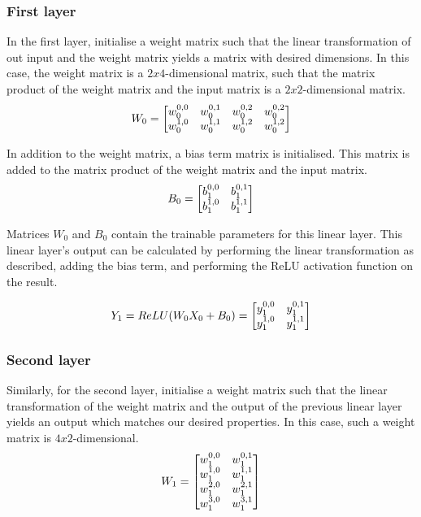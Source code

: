 \subsubsection{First layer}
In the first layer, initialise a weight matrix such that the linear transformation of out input and the weight matrix yields a matrix with desired dimensions.
In this case, the weight matrix is a $ 2 x 4 $-dimensional matrix, such that the matrix product of the weight matrix and the input matrix is a $ 2 x 2 $-dimensional matrix.
\[
W_0 =
\begin{bmatrix}
    w^{0,\space 0}_0 & w^{0,\space 1}_0 & w^{0,\space 2}_0 & w^{0,\space 2}_0 \\
    w^{1,\space 0}_0 & w^{1,\space 1}_0 & w^{1,\space 2}_0 & w^{1,\space 2}_0
\end{bmatrix}
\]

In addition to the weight matrix, a bias term matrix is initialised. This matrix is added to the matrix product of the weight matrix and the input matrix.
\[
B_0 = 
\begin{bmatrix}
    b^{0,\space 0}_1 & b^{0,\space 1}_1 \\
    b^{1,\space 0}_1 & b^{1,\space 1}_1
\end{bmatrix}
\]

Matrices $ W_0 $ and $ B_0 $ contain the trainable parameters for this linear layer.
This linear layer's output can be calculated by performing the linear transformation as described, adding the bias term, and performing the ReLU activation function on the result.

\[
Y_1 = ReLU(W_0 X_0 + B_0) = 
\begin{bmatrix}
    y^{0,\space 0}_1 & y^{0,\space 1}_1 \\
    y^{1,\space 0}_1 & y^{1,\space 1}_1 \\
\end{bmatrix}
\]

\subsubsection{Second layer}
Similarly, for the second layer, initialise a weight matrix such that the linear transformation of the weight matrix and the output of the previous linear layer yields an output which matches our desired properties.
In this case, such a weight matrix is $ 4 x 2 $-dimensional.
\[
W_1 = 
\begin{bmatrix}
    w_1^{0,\space 0} & w_1^{0,\space 1} \\
    w_1^{1,\space 0} & w_1^{1,\space 1} \\
    w_1^{2,\space 0} & w_1^{2,\space 1} \\
    w_1^{3,\space 0} & w_1^{3,\space 1}
\end{bmatrix}
\]

